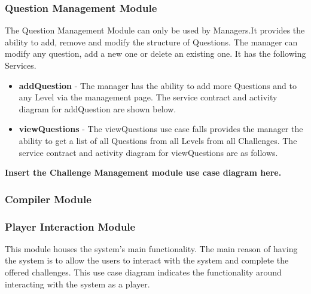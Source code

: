 \documentclass[english]{article}
\begin{document}
		\subsubsection{Question Management Module}
		The Question Management Module can only be used by Managers.It provides the ability to add, remove and modify the structure of Questions. The manager can modify any question, add a new one or delete an existing one. It has the following Services.
		
		\begin{itemize}
	  		\item \textbf{addQuestion} -  The manager has the ability to add more Questions and to any Level via the management page. The service contract and activity diagram for addQuestion are shown below.
	  		
			\item \textbf{viewQuestions} - The viewQuestions use case falls provides the manager the ability to get a list of all Questions from all Levels from all Challenges. The service contract and activity diagram for viewQuestions are as follows.
			
	
		\end{itemize}
		
\textbf{Insert the Challenge Management module use case diagram here.} \newline
		\subsubsection{Compiler Module}
		\subsubsection{Player Interaction Module}
		This module houses the system's main functionality. The main reason of having the system is to allow the users to interact with the system and complete the offered challenges. This use case diagram indicates the functionality around interacting with the system as a player.
		
		
\end{document}
